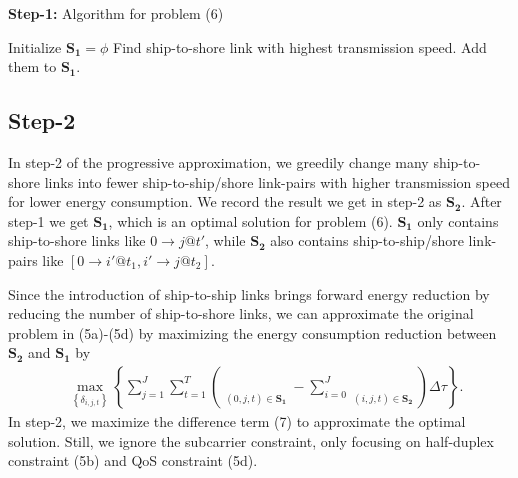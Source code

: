\documentclass[conference]{IEEEtran}
\begin{document}
 \begin{algorithm}[ht]
  \caption{\textbf{Step-1:} Algorithm for problem (6)}
  \begin{algorithmic}[1]
  \STATE Initialize ${{\mathbf{S}}_{\mathbf{1}}}=\phi$
    \STATE Find ship-to-shore link with highest transmission speed. 
    \STATE Add them to ${{\mathbf{S}}_{\mathbf{1}}}$.
    \ENDWHILE
  \ENDFOR
 \end{algorithmic}
 \end{algorithm}

 \subsection{Step-2}
 
 In step-2 of the progressive approximation, we greedily change many ship-to-shore links into fewer ship-to-ship/shore link-pairs with higher transmission speed for lower energy consumption. We record the result we get in step-2 as ${{\mathbf{S}}_{\mathbf{2}}}$. After step-1 we get ${{\mathbf{S}}_{\mathbf{1}}}$, which is an optimal solution for problem (6). ${{\mathbf{S}}_{\mathbf{1}}}$ only contains ship-to-shore links like $0 \to j@t'$, while ${{\mathbf{S}}_{\mathbf{2}}}$ also contains ship-to-ship/shore link-pairs like $\left[ {0 \to i'@{t_1},i' \to j@{t_2}} \right]$. 
 
 Since the introduction of ship-to-ship links brings forward energy reduction by reducing the number of ship-to-shore links, we can approximate the original problem in (5a)-(5d) by maximizing the energy consumption reduction between ${{\mathbf{S}}_{\mathbf{2}}}$ and ${{\mathbf{S}}_{\mathbf{1}}}$ by 
 \begin{align}
   &\mathop {\max }\limits_{{\left\{ {{\delta _{i,j,t}}} \right\}}} \left\{ {{\sum\limits_{j = 1}^J \sum\limits_{t = 1}^{T}{\left( {\mathop {{P_{0}}\delta _{0,j,t} }\limits_{\left( {0,j,t} \right) \in {{\mathbf{S}}_{\mathbf{1}}}} - \sum\limits_{i = 0}^J {\mathop {{P_{i}}\delta _{i,j,t}}\limits_{\left( {i,j,t} \right) \in {{\mathbf{S}}_{\mathbf{2}}}} } } \right) \Delta \tau } } } \right\}.
 \end{align}
 In step-2, we maximize the difference term (7) to approximate the optimal solution. Still, we ignore the subcarrier constraint, only focusing on half-duplex constraint (5b) and QoS constraint (5d). 
\end{document}
